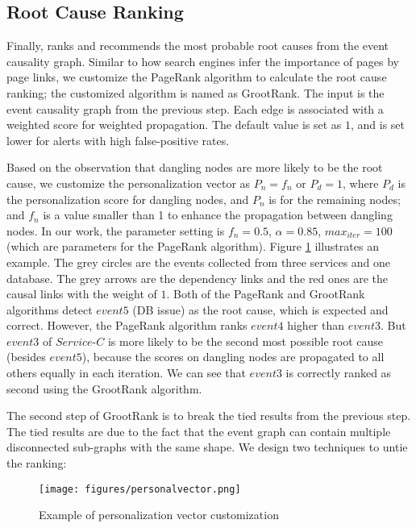 \subsection{Root Cause Ranking}
Finally, \system ranks and recommends the most probable root causes from the event causality graph. Similar to how search engines infer the importance of pages by page links, we customize the PageRank \cite{manning2010introduction} algorithm to calculate the root cause ranking; the customized algorithm is named as GrootRank. The input is the event causality graph from the previous step. Each edge is associated with a weighted score for weighted propagation. The default value is set as $1$, and is set lower for alerts with high false-positive rates. 

Based on the observation that dangling nodes are more likely to be the root cause, we customize the personalization vector as $P_n = f_n $ or $P_d = 1$, where $P_d$ is the personalization score for dangling nodes, and $P_n$ is for the remaining nodes; and $f_n$ is a value smaller than 1 to enhance the propagation between dangling nodes. In our work, the parameter setting is $f_n = 0.5$, $\alpha = 0.85$, $max_{iter} = 100$ (which are parameters for the PageRank algorithm). Figure \ref{fig:person} illustrates an example. The grey circles are the events collected from three services and one database. The grey arrows are the dependency links and the red ones are the causal links with the weight of $1$. Both of the PageRank and GrootRank algorithms detect $event 5$ (DB issue) as the root cause, which is expected and correct. However, the PageRank algorithm ranks $event 4$ higher than $event 3$. But $event 3$ of $\textit{Service-C}$ is more likely to be the second most possible root cause (besides $event 5$), because the scores on dangling nodes are propagated to all others equally in each iteration. We can see that $event 3$ is correctly ranked as second using the GrootRank algorithm.

The second step of GrootRank is to break the tied results from the previous step. The tied results are due to the fact that the event graph can contain multiple disconnected sub-graphs with the same shape. We design two techniques to untie the ranking: 
\begin{figure}[t]
\centering
  \texttt{[image: figures/personalvector.png]}
  \caption{Example of personalization vector customization}
  \label{fig:person}
\end{figure}

